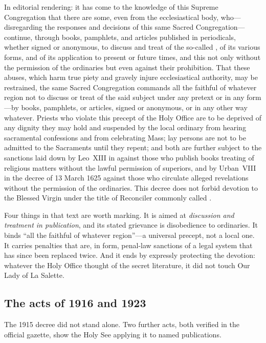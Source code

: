 In editorial rendering: it has come to the knowledge of this Supreme
Congregation that there are some, even from the ecclesiastical body,
who---disregarding the responses and decisions of this same Sacred
Congregation---continue, through books, pamphlets, and articles
published in periodicals, whether signed or anonymous, to discuss
and treat of the so-called , of its
various forms, and of its application to present or future times,
and this not only without the permission of the ordinaries but even
against their prohibition. That these abuses, which harm true piety
and gravely injure ecclesiastical authority, may be restrained, the
same Sacred Congregation commands all the faithful of whatever
region not to discuss or treat of the said subject under any pretext
or in any form---by books, pamphlets, or articles, signed or
anonymous, or in any other way whatever. Priests who violate this
precept of the Holy Office are to be deprived of any dignity they
may hold and suspended by the local ordinary from hearing
sacramental confessions and from celebrating Mass; lay persons are
not to be admitted to the Sacraments until they repent; and both are
further subject to the sanctions laid down by Leo~XIII in
 against those who publish books
treating of religious matters without the lawful permission of
superiors, and by Urban~VIII in the decree of 13 March 1625 against
those who circulate alleged revelations without the permission of
the ordinaries. This decree does not forbid devotion to the Blessed
Virgin under the title of Reconciler commonly called .

Four things in that text are worth marking. It is aimed at
\emph{discussion and treatment in publication}, and its stated
grievance is disobedience to ordinaries. It binds ``all the faithful
of whatever region''---a universal precept, not a local one. It
carries penalties that are, in form, penal-law sanctions of a legal
system that has since been replaced twice. And it ends by expressly
protecting the devotion: whatever the Holy Office thought of the
secret literature, it did not touch Our Lady of La Salette.

\subsection{The acts of 1916 and 1923}

The 1915 decree did not stand alone. Two further acts, both verified
in the official gazette, show the Holy See applying it to named
publications.

